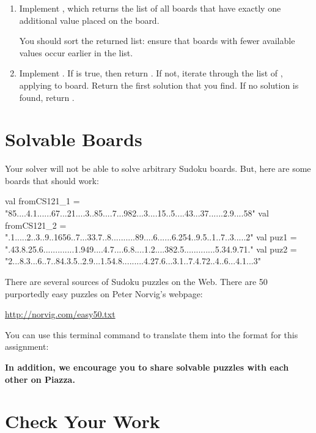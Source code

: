 \documentclass[9pt]{extbook}
\begin{document}
\begin{enumerate}
\item Implement , which returns the list of all boards that have
   exactly one additional value placed on the board.

   You should sort the returned list: ensure that boards with fewer available
   values occur earlier in the list.

\item Implement . If  is true, then return .
   If not, iterate through the list of , applying  to
   board. Return the first solution that you find. If no solution is found,
   return .

\end{enumerate}


\section{Solvable Boards}

Your solver will not be able to solve arbitrary Sudoku boards. But,
here are some boards that should work:

\begin{scalacode}
val fromCS121_1 = 
  "85....4.1......67...21....3..85....7...982...3....15..5....43...37......2.9....58"
val fromCS121_2 = 
  ".1.....2..3..9..1656..7...33.7..8..........89....6......6.254..9.5..1..7..3.....2"
val puz1 = 
  ".43.8.25.6.............1.949....4.7....6.8....1.2....382.5.............5.34.9.71."
val puz2 = 
  "2...8.3...6..7..84.3.5..2.9...1.54.8.........4.27.6...3.1..7.4.72..4..6...4.1...3"
\end{scalacode}

There are several sources of Sudoku puzzles on the Web. There are
50 purportedly easy puzzles on Peter Norvig's webpage:

\url{http://norvig.com/easy50.txt}

You can use this terminal command to translate them into the format for this assignment:


\textbf{In addition, we encourage you to share solvable puzzles with each other on Piazza.}

\section{Check Your Work}
\end{document}
